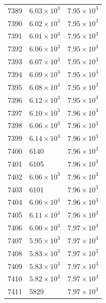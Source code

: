 \begin{table}[H]
\begin{tabular}{lll}
7389 & $\displaystyle 6.03 \times 10^{3}$ & $\displaystyle 7.95 \times 10^{3}$ \\
7390 & $\displaystyle 6.02 \times 10^{3}$ & $\displaystyle 7.95 \times 10^{3}$ \\
7391 & $\displaystyle 6.01 \times 10^{3}$ & $\displaystyle 7.95 \times 10^{3}$ \\
7392 & $\displaystyle 6.06 \times 10^{3}$ & $\displaystyle 7.95 \times 10^{3}$ \\
7393 & $\displaystyle 6.07 \times 10^{3}$ & $\displaystyle 7.95 \times 10^{3}$ \\
7394 & $\displaystyle 6.09 \times 10^{3}$ & $\displaystyle 7.95 \times 10^{3}$ \\
7395 & $\displaystyle 6.08 \times 10^{3}$ & $\displaystyle 7.95 \times 10^{3}$ \\
7396 & $\displaystyle 6.12 \times 10^{3}$ & $\displaystyle 7.95 \times 10^{3}$ \\
7397 & $\displaystyle 6.10 \times 10^{3}$ & $\displaystyle 7.96 \times 10^{3}$ \\
7398 & $\displaystyle 6.06 \times 10^{3}$ & $\displaystyle 7.96 \times 10^{3}$ \\
7399 & $\displaystyle 6.14 \times 10^{3}$ & $\displaystyle 7.96 \times 10^{3}$ \\
7400 & 6140 & $\displaystyle 7.96 \times 10^{3}$ \\
7401 & 6105 & $\displaystyle 7.96 \times 10^{3}$ \\
7402 & $\displaystyle 6.06 \times 10^{3}$ & $\displaystyle 7.96 \times 10^{3}$ \\
7403 & 6101 & $\displaystyle 7.96 \times 10^{3}$ \\
7404 & $\displaystyle 6.06 \times 10^{3}$ & $\displaystyle 7.96 \times 10^{3}$ \\
7405 & $\displaystyle 6.11 \times 10^{3}$ & $\displaystyle 7.96 \times 10^{3}$ \\
7406 & $\displaystyle 6.00 \times 10^{3}$ & $\displaystyle 7.97 \times 10^{3}$ \\
7407 & $\displaystyle 5.95 \times 10^{3}$ & $\displaystyle 7.97 \times 10^{3}$ \\
7408 & $\displaystyle 5.83 \times 10^{3}$ & $\displaystyle 7.97 \times 10^{3}$ \\
7409 & $\displaystyle 5.83 \times 10^{3}$ & $\displaystyle 7.97 \times 10^{3}$ \\
7410 & $\displaystyle 5.82 \times 10^{3}$ & $\displaystyle 7.97 \times 10^{3}$ \\
7411 & 5829 & $\displaystyle 7.97 \times 10^{3}$ \\

\end{tabular}
\end{table}
